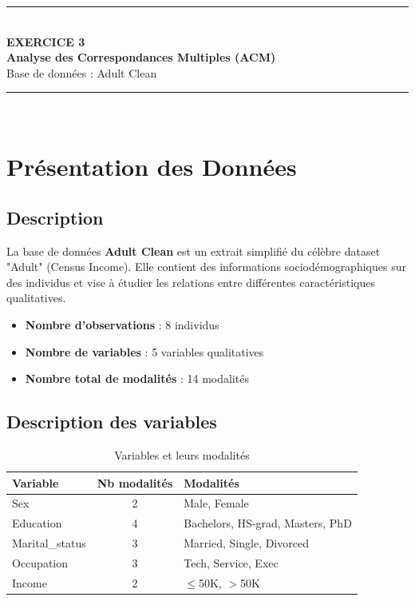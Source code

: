 \documentclass[12pt,a4paper]{article}
\begin{document}
\begin{center}
    \rule{\linewidth}{0.5mm}\\[0.4cm]
    {\Huge \textbf{EXERCICE 3}}\\[0.3cm]
    {\Large \textbf{Analyse des Correspondances Multiples (ACM)}}\\[0.2cm]
    {\large Base de données : Adult Clean}\\[0.1cm]
    \rule{\linewidth}{0.5mm}\\[1cm]
\end{center}

\section{Présentation des Données}

\subsection{Description}

La base de données \textbf{Adult Clean} est un extrait simplifié du célèbre dataset "Adult" (Census Income). Elle contient des informations sociodémographiques sur des individus et vise à étudier les relations entre différentes caractéristiques qualitatives.

\begin{itemize}
    \item \textbf{Nombre d'observations} : 8 individus
    \item \textbf{Nombre de variables} : 5 variables qualitatives
    \item \textbf{Nombre total de modalités} : 14 modalités
\end{itemize}

\subsection{Description des variables}

\begin{table}[H]
\centering
\caption{Variables et leurs modalités}
\begin{tabular}{|l|c|l|}
\hline
\textbf{Variable} & \textbf{Nb modalités} & \textbf{Modalités} \\
\hline
Sex & 2 & Male, Female \\
Education & 4 & Bachelors, HS-grad, Masters, PhD \\
Marital\_status & 3 & Married, Single, Divorced \\
Occupation & 3 & Tech, Service, Exec \\
Income & 2 & $\leq$50K, $>$50K \\
\hline
\end{tabular}
\end{table}
\end{document}
